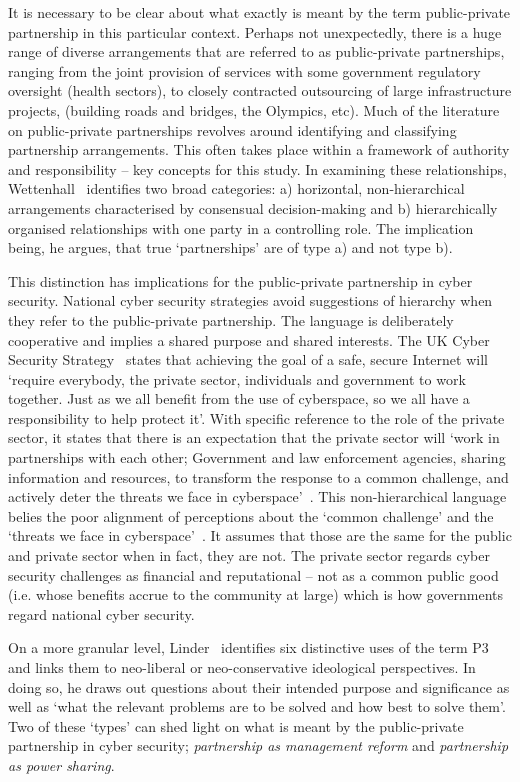 \documentclass[a4paper,11pt]{article}
\begin{document}
It is necessary to be clear about what exactly is meant by the
term public-private partnership in this particular context. Perhaps
not unexpectedly, there is a huge range of diverse arrangements that
are referred to as public-private partnerships, ranging from the joint
provision of services with some government regulatory oversight
(health sectors), to closely contracted outsourcing of large
infrastructure projects, (building roads and bridges, the Olympics,
etc). Much of the literature on public-private partnerships revolves
around identifying and classifying partnership arrangements. This
often takes place within a framework of authority and responsibility
-- key concepts for this study. In examining these relationships,
Wettenhall~\cite{wettenhall:2003} identifies two broad categories: a)
horizontal, non-hierarchical arrangements characterised by consensual
decision-making and b) hierarchically organised relationships with one
party in a controlling role. The implication being, he argues, that
true `partnerships' are of type a) and not type b).

This distinction has implications for the public-private partnership
in cyber security. National cyber security strategies avoid
suggestions of hierarchy when they refer to the public-private
partnership. The language is deliberately cooperative and implies a
shared purpose and shared interests. The UK Cyber Security
Strategy~\cite{ukcss:2011} states that achieving the goal of a safe,
secure Internet will `require everybody, the private sector,
individuals and government to work together. Just as we all benefit
from the use of cyberspace, so we all have a responsibility to help
protect it'. With specific reference to the role of the private
sector, it states that there is an expectation that the private sector
will `work in partnerships with each other; Government and law
enforcement agencies, sharing information and resources, to transform
the response to a common challenge, and actively deter the threats we
face in cyberspace'~\cite{ukcss:2013}.  This non-hierarchical language
belies the poor alignment of perceptions about the `common challenge'
and the `threats we face in cyberspace'~\cite{uknao:2013}. It assumes
that those are the same for the public and private sector when in
fact, they are not. The private sector regards cyber security
challenges as financial and reputational -- not as a common public
good (i.e. whose benefits accrue to the community at large) which is
how governments regard national cyber security.

On a more granular level, Linder~\cite{linder:1999} identifies six
distinctive uses of the term P3 and links them to neo-liberal or
neo-conservative ideological perspectives. In doing so, he draws out
questions about their intended purpose and significance as well as
`what the relevant problems are to be solved and how best to solve
them'. Two of these `types' can shed light on what is meant by the
public-private partnership in cyber security; {\emph{partnership as
management reform}} and {\emph{partnership as power sharing}}.
\end{document}
